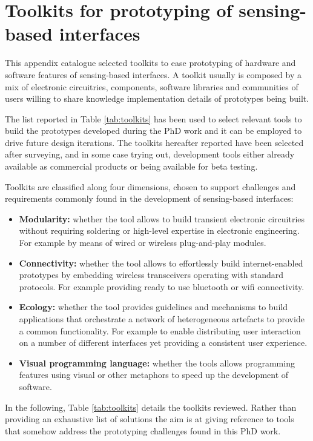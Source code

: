 \chapter{Toolkits for prototyping of sensing-based interfaces} \label{toolkits}

This appendix catalogue selected toolkits to ease prototyping of hardware and software features of sensing-based interfaces. A toolkit usually is composed by a mix of electronic circuitries, components, software libraries and communities of users willing to share knowledge implementation details of prototypes being built. 

The list reported in Table \ref{tab:toolkits} has been used to select relevant tools to build the prototypes developed during the PhD work and it can be employed to drive future design iterations.  The toolkits hereafter reported have been selected after surveying, and in some case trying out, development tools either already available as commercial products or being available for beta testing. 

Toolkits are classified along four dimensions, chosen to support  challenges and requirements commonly found in the development of sensing-based interfaces:

\begin{itemize}
	\item \textbf{Modularity: }whether the tool allows to build transient electronic circuitries without requiring soldering or high-level expertise in electronic engineering. For example by means of wired or wireless plug-and-play modules. 
	\item \textbf{Connectivity: }whether the tool allows to effortlessly build internet-enabled prototypes by embedding wireless transceivers operating with standard protocols. For example providing ready to use bluetooth or wifi connectivity.
	\item \textbf{Ecology: }whether the tool provides guidelines and mechanisms to build applications that orchestrate a network of heterogeneous artefacts to provide a common functionality. For example to enable distributing user interaction on a number of different interfaces yet providing a consistent user experience.
	\item \textbf{Visual programming language: }whether the tools allows programming features using visual or other metaphors to speed up the development of software.
\end{itemize} 

In the following, Table \ref{tab:toolkits} details the toolkits reviewed. Rather than providing an exhaustive list of solutions the aim is at giving reference to tools that somehow address the prototyping challenges found in this PhD work. 

